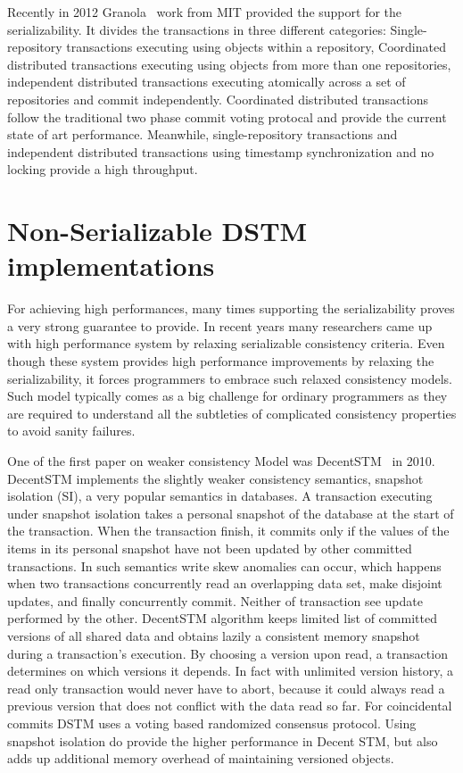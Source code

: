 \documentclass[12pt,english]{report}
\begin{document}
Recently in 2012 Granola~\cite{cowling2012granola} work from MIT provided the support for the serializability. It divides the transactions in three different categories: Single-repository transactions executing using objects within a repository, Coordinated distributed transactions executing using objects from more than one repositories, independent distributed transactions executing atomically across a set of repositories and commit independently. Coordinated distributed transactions follow the traditional two phase commit voting protocal and provide the current state of art performance. Meanwhile, single-repository transactions and independent distributed transactions using timestamp synchronization and no locking provide a high throughput.   

\section{Non-Serializable DSTM implementations}

For achieving high performances, many times supporting the serializability proves a very strong guarantee to provide. In recent years many researchers came up with high performance system by relaxing  serializable consistency criteria. Even though these system provides high performance improvements by relaxing the serializability, it forces programmers to embrace such relaxed consistency models. Such model typically comes as a big challenge for ordinary programmers as they are required to understand all the subtleties of complicated consistency properties to avoid sanity failures.

One of the first paper on weaker consistency Model was DecentSTM~\cite{DecentSTM:5470446} in 2010. DecentSTM implements the slightly weaker consistency semantics, snapshot isolation (SI), a very popular semantics in databases. A transaction executing under snapshot isolation takes a personal snapshot of the database at the start of the transaction. When the transaction finish, it commits only if the values of the items in its personal snapshot have not been updated by other committed transactions. In such semantics write skew anomalies can occur, which happens when two transactions concurrently read an overlapping data set, make disjoint updates, and finally concurrently commit. Neither of transaction see update performed by the other. DecentSTM algorithm keeps limited list of committed versions of all shared data and obtains lazily a consistent memory snapshot during a transaction’s execution. By choosing a version upon read, a transaction determines on which versions it depends. In fact with unlimited version history, a read only transaction would never have to abort, because it could always read a previous version that does not conflict with the data read so far. For coincidental commits DSTM uses a voting based randomized consensus protocol. Using snapshot isolation do provide the higher performance in Decent STM, but also adds up additional memory overhead of maintaining versioned objects.  
\end{document}

